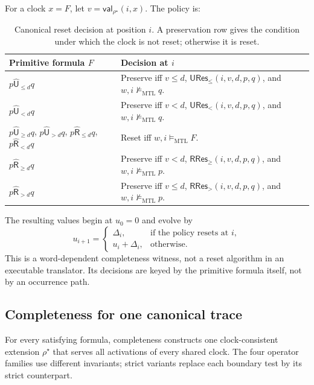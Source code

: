\documentclass{ieeeaccess}
\newcommand{\satM}{\models_{\mathrm{MTL}}}
\newcommand{\hUntil}{\mathbin{\widehat{\mathsf{U}}}}
\newcommand{\hRelease}{\mathbin{\widehat{\mathsf{R}}}}
\newcommand{\CVal}{\mathsf{val}}
\begin{document}
For a clock $x=F$, let $v=\CVal_{\rho^\star}(i,x)$. The policy is:
\begin{table}[t]
\centering
\caption{Canonical reset decision at position $i$. A preservation row gives
the condition under which the clock is not reset; otherwise it is reset.}
\label{tab:canonical-policy}
\begin{tabular}{@{}p{}p{}@{}}
\toprule
Primitive formula $F$ & Decision at $i$\\
\midrule
$p\hUntil_{\le d}q$ &
Preserve iff $v\le d$, $\mathsf{URes}_{\le}(i,v,d,p,q)$, and
$w,i\not\satM q$.\\
$p\hUntil_{<d}q$ &
Preserve iff $v<d$, $\mathsf{URes}_{<}(i,v,d,p,q)$, and
$w,i\not\satM q$.\\
$p\hUntil_{\ge d}q$, $p\hUntil_{>d}q$,
$p\hRelease_{\le d}q$, $p\hRelease_{<d}q$ &
Reset iff $w,i\satM F$.\\
$p\hRelease_{\ge d}q$ &
Preserve iff $v<d$, $\mathsf{RRes}_{\ge}(i,v,d,p,q)$, and
$w,i\not\satM p$.\\
$p\hRelease_{>d}q$ &
Preserve iff $v\le d$, $\mathsf{RRes}_{>}(i,v,d,p,q)$, and
$w,i\not\satM p$.\\
\bottomrule
\end{tabular}
\end{table}
The resulting values begin at $u_0=0$ and evolve by
\[
u_{i+1}=
\begin{cases}
\Delta_i,&\text{if the policy resets at }i,\\
u_i+\Delta_i,&\text{otherwise.}
\end{cases}
\]
This is a word-dependent completeness witness, not a reset algorithm in an
executable translator. Its decisions are keyed by the primitive formula
itself, not by an occurrence path.

\subsection{Completeness for one canonical trace}
\label{subsec:primitive-completeness}
For every satisfying formula, completeness constructs one clock-consistent
extension $\rho^\star$ that serves all activations of every shared clock.
The four operator families use different invariants; strict variants replace
each boundary test by its strict counterpart.
\end{document}
